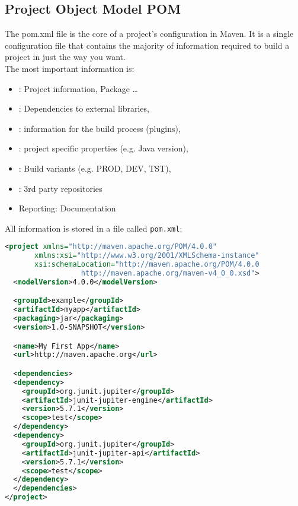 \subsection{Project Object Model POM}
The pom.xml file is the core of a project's configuration in Maven.
It is a single configuration file that contains the majority of
information required to build a project in just the way you want.\\
The most important information is:
\begin{itemize}
\item {}: Project information, Package \ldots
\item {}: Dependencies to external libraries,
\item {}: information for the build process (plugins),
\item {}: project specific properties (e.g. Java version),
\item {}: Build variants (e.g. PROD, DEV, TST),
\item {}: 3rd party repositories
\item Reporting: Documentation
\end{itemize}
All information is stored in a file called \verb|pom.xml|:
\begin{lstlisting}[language=xml,
   morekeywords={modelVersion,groupId,artifactId,
   packaging,version,name,url,dependencies,dependency,scope,project}]
  <project xmlns="http://maven.apache.org/POM/4.0.0"
       xmlns:xsi="http://www.w3.org/2001/XMLSchema-instance"
       xsi:schemaLocation="http://maven.apache.org/POM/4.0.0
                  http://maven.apache.org/maven-v4_0_0.xsd">
  <modelVersion>4.0.0</modelVersion>

  <groupId>example</groupId>
  <artifactId>myapp</artifactId>
  <packaging>jar</packaging>
  <version>1.0-SNAPSHOT</version>

  <name>My First App</name>
  <url>http://maven.apache.org</url>

  <dependencies>
  <dependency>
    <groupId>org.junit.jupiter</groupId>
    <artifactId>junit-jupiter-engine</artifactId>
    <version>5.7.1</version>
    <scope>test</scope>
  </dependency>
  <dependency>
    <groupId>org.junit.jupiter</groupId>
    <artifactId>junit-jupiter-api</artifactId>
    <version>5.7.1</version>
    <scope>test</scope>
  </dependency>
  </dependencies>
</project>
\end{lstlisting}
\newslide
